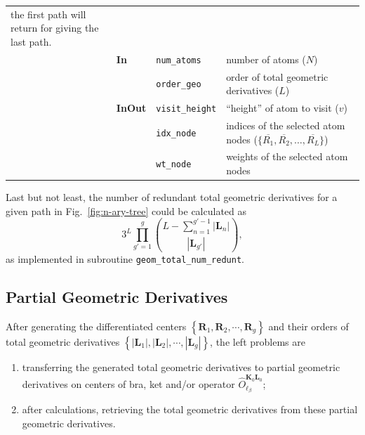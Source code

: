 \documentclass[a4paper,11pt,twoside,openright]{book}
\begin{document}
\begin{center}
\begin{longtable}{l|p{1.1cm}|p{2.3cm}p{7.6cm}}
{        the first path will return for giving the last path.}\\
    \cline{2-4}
    & \textbf{In} & \verb|num_atoms| & number of atoms ($N$)\\
    \cline{3-4}
    & & \verb|order_geo| & order of total geometric derivatives ($L$)\\
    \cline{2-4}
    & \textbf{InOut} & \verb|visit_height| & ``height'' of atom to visit ($v$)\\
    \cline{3-4}
    & & \verb|idx_node| & indices of the selected atom nodes ($\{\overline{R_{1}},\overline{R_{2}},\dots,\overline{R_{L}}\}$)\\
    \cline{3-4}
    & & \verb|wt_node| & weights of the selected atom nodes\\
  \end{longtable}
\end{center}

Last but not least, the number of redundant total geometric derivatives for a given path
in Fig.~\ref{fig:n-ary-tree} could be calculated as
\begin{equation}
  3^{L}\prod_{g'=1}^{g}\binom{L-\sum_{n=1}^{g'-1}|\boldsymbol{L}_{n}|}{|\boldsymbol{L}_{g'}|},
\end{equation}
as implemented in subroutine \verb|geom_total_num_redunt|.

\subsection{Partial Geometric Derivatives}
\label{subsec:geom-part}

After generating the differentiated centers
$\left\{\boldsymbol{R}_{1},\boldsymbol{R}_{2},\cdots,\boldsymbol{R}_{g}\right\}$
and their orders of total geometric derivatives
$\left\{|\boldsymbol{L}_{1}|,|\boldsymbol{L}_{2}|,\cdots,|\boldsymbol{L}_{g}|\right\}$,
the left problems are
\begin{enumerate}
  \item transferring the generated total geometric derivatives to partial geometric derivatives
on centers of bra, ket and/or operator $\hat{O}_{\ell_{\beta}}^{\boldsymbol{K}_{0}\boldsymbol{L}_{0}}$;
  \item after calculations, retrieving the total geometric derivatives from these partial geometric derivatives.
\end{enumerate}
\end{document}
